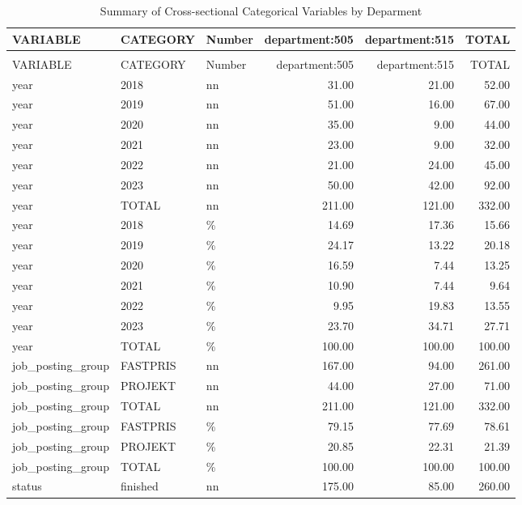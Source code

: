 \begingroup\fontsize{9}{11}\selectfont

\begin{longtable}[t]{lllrrr}
\caption{Summary of Cross-sectional Categorical Variables by Deparment}\\
\toprule
VARIABLE & CATEGORY & Number & department:505 & department:515 & TOTAL\\
\midrule
\endfirsthead
\caption[]{Summary of Cross-sectional Categorical Variables by Deparment }\\
\toprule
VARIABLE & CATEGORY & Number & department:505 & department:515 & TOTAL\\
\midrule
\endhead

\endfoot
\bottomrule
\endlastfoot
year & 2018 & nn & 31.00 & 21.00 & 52.00\\
year & 2019 & nn & 51.00 & 16.00 & 67.00\\
year & 2020 & nn & 35.00 & 9.00 & 44.00\\
year & 2021 & nn & 23.00 & 9.00 & 32.00\\
year & 2022 & nn & 21.00 & 24.00 & 45.00\\
year & 2023 & nn & 50.00 & 42.00 & 92.00\\
year & TOTAL & nn & 211.00 & 121.00 & 332.00\\
year & 2018 & \% & 14.69 & 17.36 & 15.66\\
year & 2019 & \% & 24.17 & 13.22 & 20.18\\
year & 2020 & \% & 16.59 & 7.44 & 13.25\\
year & 2021 & \% & 10.90 & 7.44 & 9.64\\
year & 2022 & \% & 9.95 & 19.83 & 13.55\\
year & 2023 & \% & 23.70 & 34.71 & 27.71\\
year & TOTAL & \% & 100.00 & 100.00 & 100.00\\
job\_posting\_group & FASTPRIS & nn & 167.00 & 94.00 & 261.00\\
job\_posting\_group & PROJEKT & nn & 44.00 & 27.00 & 71.00\\
job\_posting\_group & TOTAL & nn & 211.00 & 121.00 & 332.00\\
job\_posting\_group & FASTPRIS & \% & 79.15 & 77.69 & 78.61\\
job\_posting\_group & PROJEKT & \% & 20.85 & 22.31 & 21.39\\
job\_posting\_group & TOTAL & \% & 100.00 & 100.00 & 100.00\\
status & finished & nn & 175.00 & 85.00 & 260.00\\

\end{longtable}
